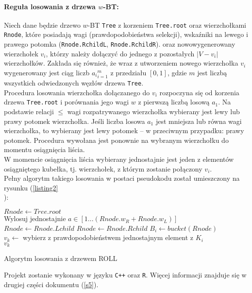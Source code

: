 \documentclass{article}
\begin{document}
	\paragraph{Reguła losowania z drzewa $w$-BT:\\}
	Niech dane będzie drzewo $w$-BT \texttt{Tree} z korzeniem \texttt{Tree.root} oraz wierzchołkami \texttt{Rnode}, które posiadają wagi (prawdopodobieństwa selekcji), wskaźniki na lewego i prawego potomka (\texttt{Rnode.RchildL}, \texttt{Rnode.RchildR}). oraz nowowygenerowany wierzchołek $v_i$, którzy należy dołączyć do jednego z pozostałych $|V - {v_i}|$ wierzchołków. Zakłada się również, że wraz z utworzeniem nowego wierzchołka $v_i$ wygenerowany jest ciąg liczb ${a_i}_{i=1}^{m}$ z przedziału $[0, 1]$, gdzie $m$ jest liczbą wszystkich odwiedzonych węzłów drzewa \texttt{Tree}.\\
	Procedura losowania wierzchołka dołączanego do $v_i$ rozpoczyna się od korzenia drzewa \texttt{Tree.root} i porównania jego wagi $w$ z pierwszą liczbą losową $a_1$. Na podstawie relacji $\leq$ wagi rozpatrywanego wierzchołka wybierany jest lewy lub prawy potomek wierzchołka. Jeśli liczba losowa 
	$a_1$ jest mniejsza lub równa wagi wierzchołka, to wybierany jest lewy potomek -- w przeciwnym przypadku: prawy potomek. Procedura wywołana jest
	ponownie na wybranym wierzchołku do momentu osiągnięcia liścia.\\
	W momencie osiągnięcia liścia wybierany jednostajnie jest jeden z elementów osiągniętego kubełka, tj. wierzchołek, z którym zostanie połączony $v_i$.\\ 
	Pełny algorytm takiego losowania w postaci pseudokodu został umieszczony na  rysunku (\ref{listing2}\\):\\

	\begin{algorithm}[H]
	$Rnode \leftarrow Tree.root$\\
	\SetAlgoNoLine
	 {
		Wylosuj  jednostajnie $a \in [1...(Rnode.w_R + Rnode.w_L)]$\\
		\SetAlgoNoLine
		 {
			$Rnode \leftarrow Rnode.Lchild$
		} {
			$Rnode \leftarrow Rnode.Rchild$
		}
	}
	$B_i \leftarrow bucket(Rnode)$\\
	$v_k \leftarrow$ wybierz z prawdopodobieństwem jednostajnym element z $K_i$\\
	\Return $v_k$
	\label{listing2}
	\caption{Algorytm losowania z drzewem ROLL}
	\end{algorithm}
	Projekt zostanie wykonany w języku \texttt{C++} oraz \texttt{R}. Więcej informacji znajduje się w drugiej części dokumentu (\ref{s5}).
\end{document}

